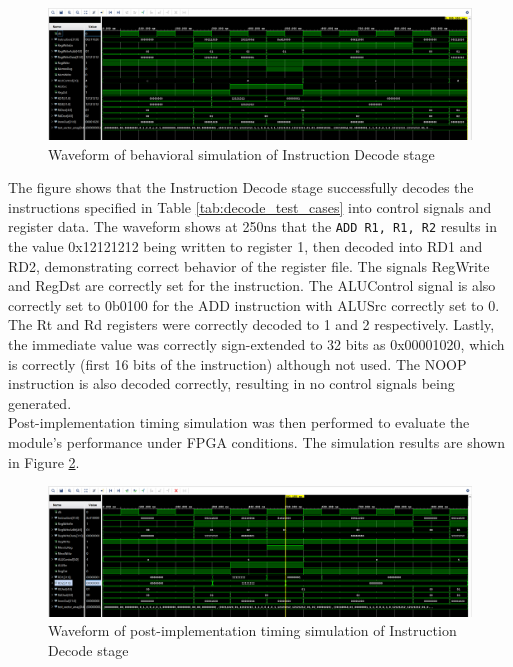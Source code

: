 \documentclass[CMPE]{../KGCOEReport}
\begin{document}
\begin{figure}[H]
    \centering
    \includegraphics[width=1\textwidth]{behave_decode.png}
    \caption{Waveform of behavioral simulation of Instruction Decode stage}
    \label{fig:behave_decode}
\end{figure}

The figure shows that the Instruction Decode stage successfully decodes the instructions specified in Table \ref{tab:decode_test_cases} into control signals and register data. The waveform shows at 250ns that the \verb|ADD R1, R1, R2| results in the value 0x12121212 being written to register 1, then decoded into RD1 and RD2, demonstrating correct behavior of the register file. The signals RegWrite and RegDst are correctly set for the instruction. The ALUControl signal is also correctly set to 0b0100 for the ADD instruction with ALUSrc correctly set to 0. The Rt and Rd registers were correctly decoded to 1 and 2 respectively. Lastly, the immediate value was correctly sign-extended to 32 bits as 0x00001020, which is correctly (first 16 bits of the instruction) although not used. The NOOP instruction is also decoded correctly, resulting in no control signals being generated.
\\

Post-implementation timing simulation was then performed to evaluate the module's performance under FPGA conditions. The simulation results are shown in Figure \ref{fig:implement_decode}.

\begin{figure}[H]
    \centering
    \includegraphics[width=1\textwidth]{implement_decode.png}
    \caption{Waveform of post-implementation timing simulation of Instruction Decode stage}
    \label{fig:implement_decode}
\end{figure}
\end{document}
